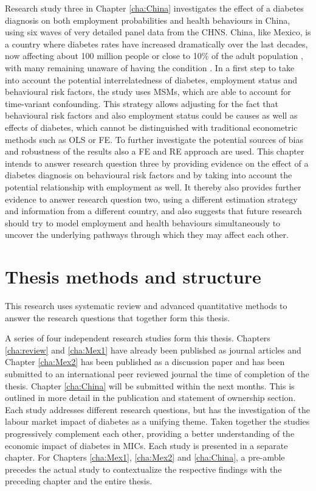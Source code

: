 Research study three in Chapter \ref{cha:China} investigates the effect of a diabetes diagnosis on both employment probabilities and health behaviours in China, using six waves of very detailed panel data from the \ac{CHNS}. China, like Mexico, is a country where diabetes rates have increased dramatically over the last decades, now affecting about 100 million people or close to 10\% of the adult population \parencite{Risk2016}, with many remaining unaware of having the condition \parencite{Wang2015}. In a first step to take into account the potential interrelatedness of diabetes, employment status and behavioural risk factors, the study uses \acp{MSM}, which are able to account for time-variant confounding. This strategy allows adjusting for the fact that behavioural risk factors and also employment status could be causes as well as effects of diabetes, which cannot be distinguished with traditional econometric methods such as \ac{OLS} or \ac{FE}. To further investigate the potential sources of bias and robustness of the results also a \ac{FE} and \ac{RE} approach are used. This chapter intends to answer research question three by providing evidence on the effect of a diabetes diagnosis on behavioural risk factors and by taking into account the potential relationship with employment as well. It thereby also provides further evidence to answer research question two, using a different estimation strategy and information from a different country, and also suggests that future research should try to model employment and health behaviours simultaneously to uncover the underlying pathways through which they may affect each other. 


\section{Thesis methods and structure}

This research uses systematic review and advanced quantitative methods to answer the research questions that together form this thesis.

A series of four independent research studies form this thesis. Chapters \ref{cha:review} and \ref{cha:Mex1} have already been published as journal articles and Chapter \ref{cha:Mex2} has been published as a discussion paper and has been submitted to an international peer reviewed journal the time of completion of the thesis. Chapter \ref{cha:China} will be submitted within the next months. This is outlined in more detail in the publication and statement of ownership section. Each study addresses different research questions, but has the investigation of the labour market impact of diabetes as a unifying theme. Taken together the studies progressively complement each other, providing a better understanding of the economic impact of diabetes in \acp{MIC}. Each study is presented in a separate chapter. For Chapters \ref{cha:Mex1}, \ref{cha:Mex2} and \ref{cha:China}, a pre-amble precedes the actual study to contextualize the respective findings with the preceding chapter and the entire thesis.


